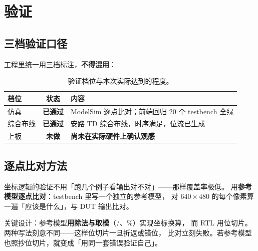 \documentclass[10pt,a4paper]{article}
\newcommand{\code}[1]{{\ttfamily\small #1}}
\begin{document}
\section{验证}
\label{sec:verify}

\subsection{三档验证口径}

工程里统一用三档标注，\textbf{不得混用}：

\begin{table}[htbp]
\centering\small
\caption{验证档位与本次实际达到的程度。}
\label{tab:verify}
\renewcommand{\arraystretch}{1.25}
\begin{tabularx}{\linewidth}{@{}l c X@{}}
\toprule
\textbf{档位} & \textbf{状态} & \textbf{内容}\\
\midrule
仿真 & \textcolor{dsaccent}{\textbf{已通过}} & ModelSim 逐点比对；前端回归 20 个 testbench 全绿\\
综合布线 & \textcolor{dsaccent}{\textbf{已通过}} & 安路 TD 综合布线，时序满足，位流已生成\\
上板 & \textcolor{dsaccent2}{\textbf{未做}} & \textbf{尚未在实际硬件上确认观感}\\
\bottomrule
\end{tabularx}
\end{table}

\subsection{逐点比对方法}

坐标逻辑的验证不用「跑几个例子看输出对不对」——那样覆盖率极低。
用\textbf{参考模型逐点比对}：testbench 里写一个独立的参考模型，
对 $640\times480$ 的每个像素算一遍「应该是什么」，与 DUT 输出比对。

关键设计：参考模型\textbf{用除法与取模}（\code{/}、\code{\%}）实现坐标换算，
而 RTL 用位切片。两种写法刻意不同——这样位切片一旦折返或错位，
比对立刻失败。若参考模型也照抄位切片，就变成「用同一套错误验证自己」。
\end{document}

